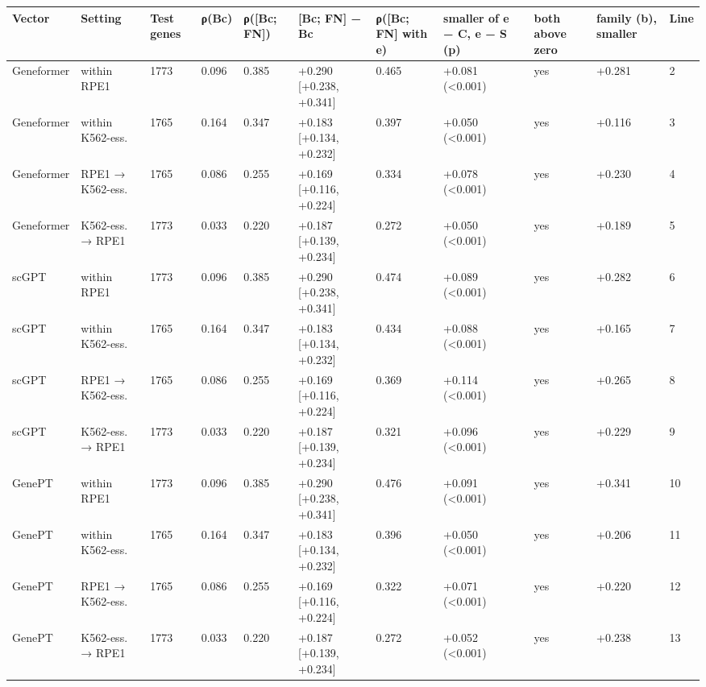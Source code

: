 \begin{tabular}{lllllllllll}
\toprule
Vector & Setting & Test genes & ρ(Bc) & ρ([Bc; FN]) & [Bc; FN] − Bc & ρ([Bc; FN] with e) & smaller of e − C, e − S (p) & both above zero & family (b), smaller & Line \\
\midrule
Geneformer & within RPE1 & 1773 & 0.096 & 0.385 & +0.290 [+0.238, +0.341] & 0.465 & +0.081 (<0.001) & yes & +0.281 & 2 \\
Geneformer & within K562-ess. & 1765 & 0.164 & 0.347 & +0.183 [+0.134, +0.232] & 0.397 & +0.050 (<0.001) & yes & +0.116 & 3 \\
Geneformer & RPE1 → K562-ess. & 1765 & 0.086 & 0.255 & +0.169 [+0.116, +0.224] & 0.334 & +0.078 (<0.001) & yes & +0.230 & 4 \\
Geneformer & K562-ess. → RPE1 & 1773 & 0.033 & 0.220 & +0.187 [+0.139, +0.234] & 0.272 & +0.050 (<0.001) & yes & +0.189 & 5 \\
scGPT & within RPE1 & 1773 & 0.096 & 0.385 & +0.290 [+0.238, +0.341] & 0.474 & +0.089 (<0.001) & yes & +0.282 & 6 \\
scGPT & within K562-ess. & 1765 & 0.164 & 0.347 & +0.183 [+0.134, +0.232] & 0.434 & +0.088 (<0.001) & yes & +0.165 & 7 \\
scGPT & RPE1 → K562-ess. & 1765 & 0.086 & 0.255 & +0.169 [+0.116, +0.224] & 0.369 & +0.114 (<0.001) & yes & +0.265 & 8 \\
scGPT & K562-ess. → RPE1 & 1773 & 0.033 & 0.220 & +0.187 [+0.139, +0.234] & 0.321 & +0.096 (<0.001) & yes & +0.229 & 9 \\
GenePT & within RPE1 & 1773 & 0.096 & 0.385 & +0.290 [+0.238, +0.341] & 0.476 & +0.091 (<0.001) & yes & +0.341 & 10 \\
GenePT & within K562-ess. & 1765 & 0.164 & 0.347 & +0.183 [+0.134, +0.232] & 0.396 & +0.050 (<0.001) & yes & +0.206 & 11 \\
GenePT & RPE1 → K562-ess. & 1765 & 0.086 & 0.255 & +0.169 [+0.116, +0.224] & 0.322 & +0.071 (<0.001) & yes & +0.220 & 12 \\
GenePT & K562-ess. → RPE1 & 1773 & 0.033 & 0.220 & +0.187 [+0.139, +0.234] & 0.272 & +0.052 (<0.001) & yes & +0.238 & 13 \\
\bottomrule
\end{tabular}
